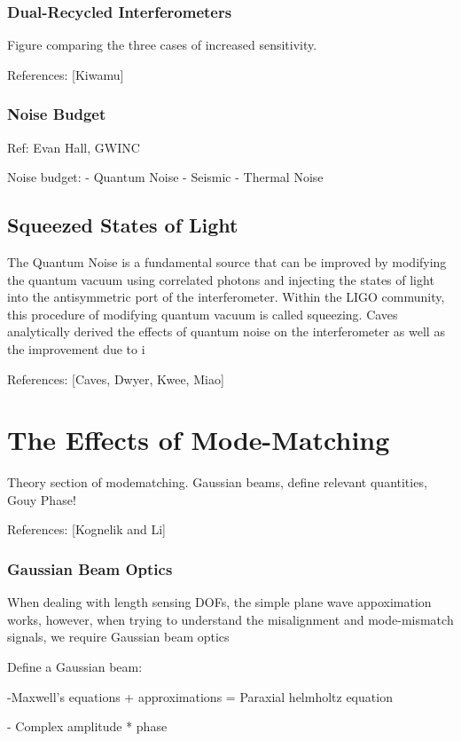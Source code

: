 \documentclass[10pt,a4paper]{book}
\begin{document}
		\subsection{Dual-Recycled Interferometers}
		
		
		Figure comparing the three cases of increased sensitivity.
		
		References: [Kiwamu]
		
		\subsection{Noise Budget}
		Ref: Evan Hall, GWINC

		Noise budget:
		- Quantum Noise
		- Seismic
		- Thermal Noise
		

	\section{Squeezed States of Light}
	The Quantum Noise is a fundamental source that can be improved by modifying the quantum vacuum using correlated photons and injecting the states of light into the antisymmetric port of the interferometer.  Within the LIGO community, this procedure of modifying quantum vacuum is called squeezing. Caves analytically derived the effects of quantum noise on the interferometer as well as the improvement due to i
	
	References: [Caves, Dwyer, Kwee, Miao]
		
\chapter{The Effects of Mode-Matching}
	Theory section of modematching. Gaussian beams, define relevant quantities, Gouy Phase!
	
	References: [Kognelik and Li]
	
		\subsection{Gaussian Beam Optics}
		When dealing with length sensing DOFs, the simple plane wave appoximation works, however, when trying to understand the misalignment and mode-mismatch signals, we require Gaussian beam optics
		
		Define a Gaussian beam:
		
		-Maxwell's equations + approximations =  Paraxial helmholtz equation
		
		- Complex amplitude * phase
		
\end{document}
